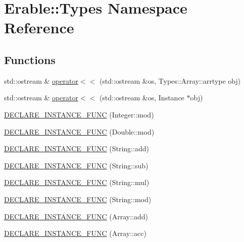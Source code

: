 \hypertarget{namespace_erable_1_1_types}{}\section{Erable\+::Types Namespace Reference}
\label{namespace_erable_1_1_types}
\subsection*{Functions}
\begin{DoxyCompactItemize}
\item 
std\+::ostream \& \mbox{\hyperlink{namespace_erable_1_1_types_a17d3c746d89d57dca7843cdb460f4c0d}{operator$<$$<$}} (std\+::ostream \&os, Types\+::\+Array\+::arrtype obj)
\item 
std\+::ostream \& \mbox{\hyperlink{namespace_erable_1_1_types_a5b9795a5d66a21616d567bd50dba567f}{operator$<$$<$}} (std\+::ostream \&os, Instance $\ast$obj)
\item 
\mbox{\hyperlink{namespace_erable_1_1_types_a45c725afd85ef95bc6d613605d61ec6b}{D\+E\+C\+L\+A\+R\+E\+\_\+\+I\+N\+S\+T\+A\+N\+C\+E\+\_\+\+F\+U\+NC}} (Integer\+::mod)
\item 
\mbox{\hyperlink{namespace_erable_1_1_types_aad61062a729b1491820016f759761046}{D\+E\+C\+L\+A\+R\+E\+\_\+\+I\+N\+S\+T\+A\+N\+C\+E\+\_\+\+F\+U\+NC}} (Double\+::mod)
\item 
\mbox{\hyperlink{namespace_erable_1_1_types_ae472df6e91e722571770c22a3742a3ab}{D\+E\+C\+L\+A\+R\+E\+\_\+\+I\+N\+S\+T\+A\+N\+C\+E\+\_\+\+F\+U\+NC}} (String\+::add)
\item 
\mbox{\hyperlink{namespace_erable_1_1_types_a2f71342b6ede6bc8824423116c0901ad}{D\+E\+C\+L\+A\+R\+E\+\_\+\+I\+N\+S\+T\+A\+N\+C\+E\+\_\+\+F\+U\+NC}} (String\+::sub)
\item 
\mbox{\hyperlink{namespace_erable_1_1_types_a18a0246480dbde2b4c3e530c6f2360f8}{D\+E\+C\+L\+A\+R\+E\+\_\+\+I\+N\+S\+T\+A\+N\+C\+E\+\_\+\+F\+U\+NC}} (String\+::mul)
\item 
\mbox{\hyperlink{namespace_erable_1_1_types_addfd47f7e18fc7bf51b569e8fd353218}{D\+E\+C\+L\+A\+R\+E\+\_\+\+I\+N\+S\+T\+A\+N\+C\+E\+\_\+\+F\+U\+NC}} (String\+::mod)
\item 
\mbox{\hyperlink{namespace_erable_1_1_types_abac7c20dfac2649ab2dfe280f7b1bf7d}{D\+E\+C\+L\+A\+R\+E\+\_\+\+I\+N\+S\+T\+A\+N\+C\+E\+\_\+\+F\+U\+NC}} (Array\+::add)
\item 
\mbox{\hyperlink{namespace_erable_1_1_types_a5c74e3d51ba00266818d6f612260006b}{D\+E\+C\+L\+A\+R\+E\+\_\+\+I\+N\+S\+T\+A\+N\+C\+E\+\_\+\+F\+U\+NC}} (Array\+::acc)

\end{DoxyCompactItemize}
